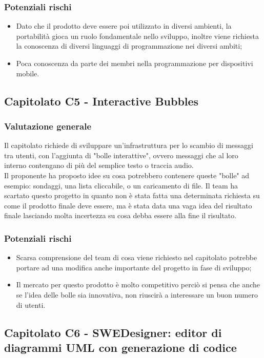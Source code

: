 \documentclass[12pt,a4paper,titlepage]{article}
\begin{document}
	\subsubsection{Potenziali rischi}
	\begin{itemize}
		\item Dato che il prodotto deve essere poi utilizzato in diversi ambienti, la portabilità gioca un ruolo fondamentale nello sviluppo, inoltre viene richiesta la conoscenza di diversi linguaggi di programmazione nei diversi ambiti;
		\item Poca conoscenza da parte dei membri nella programmazione per dispositivi mobile.
	\end{itemize}
	
	\subsection{Capitolato C5 - Interactive Bubbles}
	\subsubsection{Valutazione generale}
	Il capitolato richiede di sviluppare un'infrastruttura per lo scambio di messaggi tra utenti, con l'aggiunta di "bolle interattive", ovvero messaggi che al loro interno contengano di più del semplice testo o traccia audio.\\
	Il proponente ha proposto idee su cosa potrebbero contenere queste "bolle" ad esempio: sondaggi, una lista cliccabile, o un caricamento di file. Il team ha scartato questo progetto in quanto non è stata fatta una determinata richiesta su come il prodotto finale deve essere, ma è stata data una vaga idea del risultato finale lasciando molta incertezza su cosa debba essere alla fine il risultato.
	\subsubsection{Potenziali rischi}
	\begin{itemize}
		\item Scarsa comprensione del team di cosa viene richiesto nel capitolato potrebbe portare ad una modifica anche importante del progetto in fase di sviluppo;
		\item Il mercato per questo prodotto è molto competitivo perciò si pensa che anche se l'idea delle bolle sia innovativa, non riuscirà a interessare un buon numero di utenti.
	\end{itemize}
	
	\subsection{Capitolato C6 - SWEDesigner: editor di diagrammi UML con generazione di codice}
\end{document}
